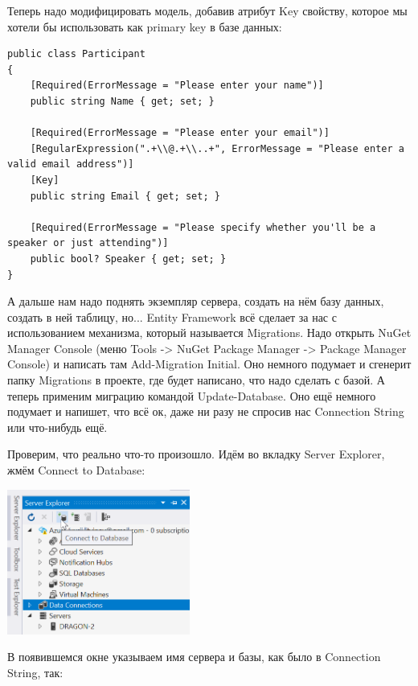 \documentclass[a5paper]{article}
\begin{document}
Теперь надо модифицировать модель, добавив атрибут Key свойству, которое мы хотели бы использовать как primary key в базе данных:

\begin{verbatim}
public class Participant
{
    [Required(ErrorMessage = "Please enter your name")]
    public string Name { get; set; }

    [Required(ErrorMessage = "Please enter your email")]
    [RegularExpression(".+\\@.+\\..+", ErrorMessage = "Please enter a valid email address")]
    [Key]
    public string Email { get; set; }

    [Required(ErrorMessage = "Please specify whether you'll be a speaker or just attending")]
    public bool? Speaker { get; set; }
}
\end{verbatim}

А дальше нам надо поднять экземпляр сервера, создать на нём базу данных, создать в ней таблицу, но... Entity Framework всё сделает за нас с использованием механизма, который называется Migrations. Надо открыть NuGet Manager Console (меню Tools -> NuGet Package Manager -> Package Manager Console) и
написать там Add-Migration Initial. Оно немного подумает и сгенерит папку Migrations в проекте, где будет написано, что надо сделать с базой. А теперь применим миграцию командой Update-Database. Оно ещё немного подумает и напишет, что всё ок, даже ни разу не спросив нас Connection String 
или что-нибудь ещё.

Проверим, что реально что-то произошло. Идём во вкладку Server Explorer, жмём Connect to Database:

\begin{center}
	\includegraphics[width=0.45\textwidth]{serverExplorer.png}
\end{center}

В появившемся окне указываем имя сервера и базы, как было в Connection String, так:
\end{document}
